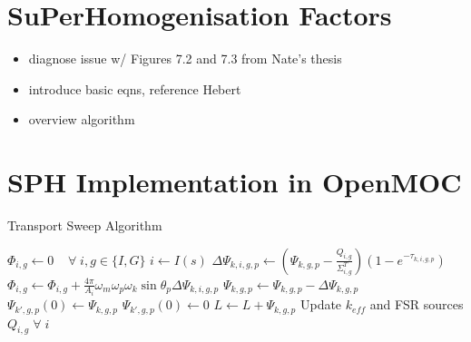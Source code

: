 \cite{hebert1993consistent}


\section{SuPerHomogenisation Factors}
\label{sec:chap5-sph}

\begin{itemize}
  \item diagnose issue w/ Figures 7.2 and 7.3 from Nate's thesis
  \item introduce basic eqns, reference Hebert
  \item overview algorithm
\end{itemize}


\section{SPH Implementation in OpenMOC}
\label{sec:chap5-sph-openmoc}


\begin{landscape}
\begin{algorithm}[!ht]
\caption{Transport Sweep Algorithm}
\label{alg:transport-sweep}
\begin{algorithmic}
    \State $\Phi_{i,g} \gets 0 \;\;\;\; \forall \; i,g \in \{I,G\}$ 
                            \State $i \gets I(s)$
                            \State $\Delta\Psi_{k,i,g,p} \gets \left(\Psi_{k,g,p} - \frac{Q_{i,g}}{\Sigma^T_{i,g}}\right)(1 - e^{-\tau_{k,i,g,p}})$ 
                            \State $\Phi_{i,g} \gets \Phi_{i,g} + \frac{4\pi}{A_i} \omega_{m}\omega_{p}\omega_{k}\sin\theta_{p}\Delta\Psi_{k,i,g,p}$ 
                            \State $\Psi_{k,g,p} \gets \Psi_{k,g,p} - \Delta\Psi_{k,g,p}$ 
                        \EndFor
                    \EndFor
                \EndFor
            \EndFor
                \State $\Psi_{k',g,p}(0) \gets \Psi_{k,g,p}$  
            \Else
                \State $\Psi_{k',g,p}(0) \gets 0$ 
                \State $L \gets L + \Psi_{k,g,p}$
            \EndIf
        \EndFor
        \State Update $k_{eff}$ and FSR sources $Q_{i,g} \;\forall\; i$ 
    \EndWhile
\end{algorithmic}
\end{algorithm}
\end{landscape}




